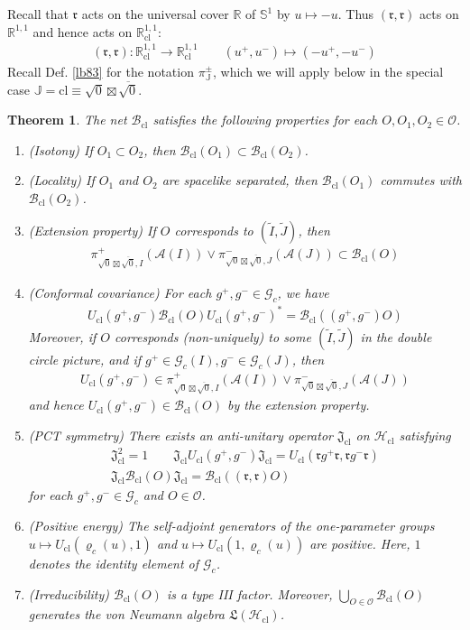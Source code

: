 \documentclass[11pt,b5paper,notitlepage]{article}
\theoremstyle{definition}
\theoremstyle{plain}
\newtheorem{thm}[df]{Theorem}
\newcommand{\fk}{\mathfrak}
\newcommand{\wtd}{\widetilde}
\newcommand{\ovl}{\overline}
\newcommand{\Rbb}{\mathbb R}
\newcommand{\Sbb}{{\mathbb S}}
\newcommand{\Gc}{\mathscr G_c}
\newcommand{\cl}{\mathrm{cl}}
\newcommand{\rk}{\mathfrak r}
\newcommand{\Jbb}{\mathbb J}
\newcommand{\MA}{\mathcal A}
\newcommand{\MO}{\mathcal O}
\newcommand{\sqz}{{\sqrt 0}}
\newcommand{\Roo}{\mathbb R^{1,1}}
\newcommand{\Rcl}{\mathbb R^{1,1}_{\mathrm{cl}}}
\newcommand{\Bcl}{\mathcal B_{\mathrm{cl}}}
\newcommand{\Hcl}{\mathcal H_{\mathrm{cl}}}
\newcommand{\Ucl}{U_{\mathrm{cl}}}
\newcommand{\Jcl}{\mathfrak J_{\mathrm{cl}}}
\numberwithin{equation}{section}
\begin{document}
Recall that $\rk$ acts on the universal cover $\Rbb$ of $\Sbb^1$ by $u\mapsto -u$. Thus $(\rk,\rk)$ acts on $\Roo$ and hence acts on $\Rcl$:
\begin{align}\label{eq44}
\pmb{(\rk,\rk)}:\Rcl\rightarrow\Rcl\qquad (u^+,u^-)\mapsto(-u^+,-u^-)
\end{align}
Recall Def. \ref{lb83} for the notation $\pi_\Jbb^\pm$, which we will apply below in the special case $\Jbb=\cl\equiv\sqz\boxtimes\ovl\sqz$.

\begin{thm}\label{lb72}
The net $\Bcl$ satisfies the following properties for each $O,O_1,O_2\in\MO$.
\begin{enumerate}[label=(\arabic*)]
\item (Isotony) If $O_1\subset O_2$, then $\Bcl(O_1)\subset\Bcl(O_2)$.
\item (Locality) If $O_1$ and $O_2$ are spacelike separated, then $\Bcl(O_1)$ commutes with $\Bcl(O_2)$.
\item (Extension property) If $O$ corresponds to $(\wtd I,\wtd J)$, then
\begin{align*}
\pi^+_{\sqz\boxtimes\ovl\sqz,I}(\MA(I))\vee \pi^-_{\sqz\boxtimes\ovl\sqz,J}(\MA(J))\subset \Bcl(O)
\end{align*}
\item (Conformal covariance) For each $g^+,g^-\in\Gc$, we have
\begin{align*}
\Ucl(g^+,g^-)\Bcl(O)\Ucl(g^+,g^-)^*=\Bcl((g^+,g^-)O)
\end{align*}
Moreover, if $O$ corresponds (non-uniquely) to some $(\wtd I,\wtd J)$ in the double circle picture, and if $g^+\in\Gc(I),g^-\in\Gc(J)$, then
\begin{align*}
\Ucl(g^+,g^-)\in\pi^+_{\sqz\boxtimes\ovl\sqz,I}(\MA(I))\vee \pi^-_{\sqz\boxtimes\ovl\sqz,J}(\MA(J))
\end{align*}
and hence $\Ucl(g^+,g^-)\in\Bcl(O)$ by the extension property.
\item (PCT symmetry) There exists an anti-unitary operator $\Jcl$ on $\Hcl$ satisfying
\begin{gather*}
\Jcl^2=1\qquad \Jcl\Ucl(g^+,g^-)\Jcl=U_\cl(\rk g^+\rk,\rk g^-\rk)\\
\Jcl\Bcl(O)\Jcl=\Bcl((\rk,\rk)O)
\end{gather*}
for each $g^+,g^-\in\Gc$ and $O\in\MO$.
\item (Positive energy) The self-adjoint generators of the one-parameter groups $u\mapsto \Ucl(\varrho_c(u),1)$ and $u\mapsto \Ucl(1,\varrho_c(u))$ are positive. Here, $1$ denotes the identity element of $\Gc$. 
\item (Irreducibility) $\Bcl(O)$ is a type III factor. Moreover, $\bigcup_{O\in\MO}\Bcl(O)$ generates the von Neumann algebra $\fk L(\Hcl)$.
\end{enumerate}
\end{thm}
\end{document}
